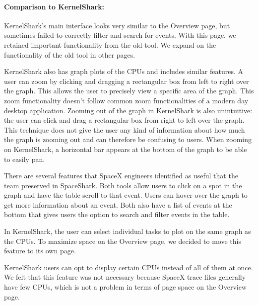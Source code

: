 \documentclass{hmcclinic}
\begin{document}
\paragraph{Comparison to KernelShark:} 
  KernelShark's main interface looks very similar to the Overview page, but
  sometimes failed to correctly filter and search for events. With this page,
  we retained important functionality from the old tool. We expand on the
  functionality of the old tool in other pages.

  KernelShark also has graph plots of the CPUs and includes similar features. A
  user can zoom by clicking and dragging a rectangular box from left to right
  over the graph.  This allows the user to precisely view a specific area of the
  graph.  This zoom functionality doesn't follow common zoom functionalities of
  a modern day desktop application. Zooming out of the graph in KernelShark is
  also unintuitive: the user can click and drag a rectangular box from right to
  left over the graph. This technique does not give the user any kind of
  information about how much the graph is zooming out and can therefore be
  confusing to users. When zooming on KernelShark, a horizontal bar appears at
  the bottom of the graph to be able to easily pan.
    
  There are several features that SpaceX engineers identified as useful that the
  team preserved in SpaceShark. Both tools allow users to click on a spot in the
  graph and have the table scroll to that event.  Users can hover over the graph
  to get more information about an event.  Both also have a list of events
  at the bottom that gives users the option to search and filter events in the
  table.

  In KernelShark, the user can select individual tasks to plot on the same graph
  as the CPUs. To maximize space on the Overview page, we decided to move this
  feature to its own page.

  KernelShark users can opt to display certain CPUs instead of all of them at
  once. We felt that this feature was not necessary because SpaceX trace files
  generally have few CPUs, which is not a problem in terms of page space on the
  Overview page.


    
\end{document}
